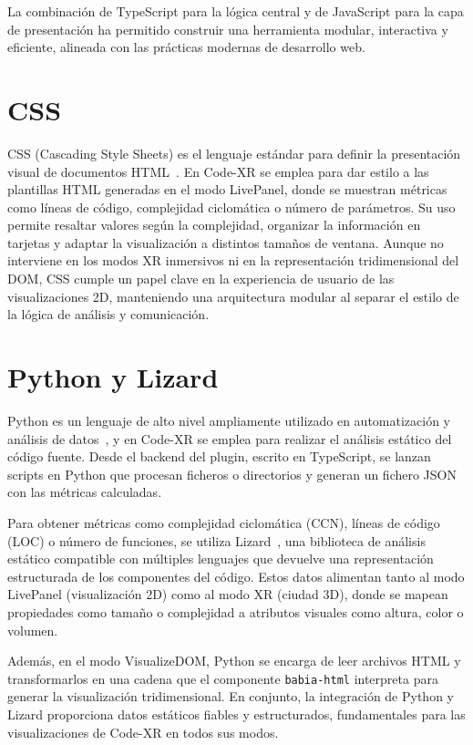 \documentclass[a4paper, 12pt]{book}
\begin{document}
La combinación de TypeScript para la lógica central y de JavaScript para la capa de presentación ha permitido construir una herramienta modular, interactiva y eficiente, alineada con las prácticas modernas de desarrollo web.

\section{CSS}
\label{sec:css}

CSS (Cascading Style Sheets) es el lenguaje estándar para definir la presentación visual de documentos HTML~\cite{css}. En Code-XR se emplea para dar estilo a las plantillas HTML generadas en el modo LivePanel, donde se muestran métricas como líneas de código, complejidad ciclomática o número de parámetros. Su uso permite resaltar valores según la complejidad, organizar la información en tarjetas y adaptar la visualización a distintos tamaños de ventana. Aunque no interviene en los modos XR inmersivos ni en la representación tridimensional del DOM, CSS cumple un papel clave en la experiencia de usuario de las visualizaciones 2D, manteniendo una arquitectura modular al separar el estilo de la lógica de análisis y comunicación.

\section{Python y Lizard}
\label{sec:python-lizard}

Python es un lenguaje de alto nivel ampliamente utilizado en automatización y análisis de datos~\cite{python}, y en Code-XR se emplea para realizar el análisis estático del código fuente. Desde el backend del plugin, escrito en TypeScript, se lanzan scripts en Python que procesan ficheros o directorios y generan un fichero JSON con las métricas calculadas.  

Para obtener métricas como complejidad ciclomática (CCN), líneas de código (LOC) o número de funciones, se utiliza Lizard~\cite{lizard}, una biblioteca de análisis estático compatible con múltiples lenguajes que devuelve una representación estructurada de los componentes del código. Estos datos alimentan tanto al modo LivePanel (visualización 2D) como al modo XR (ciudad 3D), donde se mapean propiedades como tamaño o complejidad a atributos visuales como altura, color o volumen.  

Además, en el modo VisualizeDOM, Python se encarga de leer archivos HTML y transformarlos en una cadena que el componente \texttt{babia-html} interpreta para generar la visualización tridimensional. En conjunto, la integración de Python y Lizard proporciona datos estáticos fiables y estructurados, fundamentales para las visualizaciones de Code-XR en todos sus modos.
\end{document}
